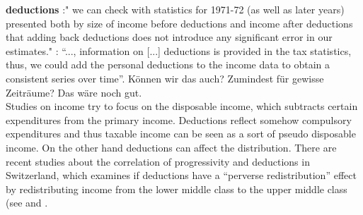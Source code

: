 \documentclass[twoside]{article}\usepackage[]{graphicx}\usepackage[]{color}
\begin{document}
\begin{multicols}{2}
\textbf{deductions} \citet[477]{dell_income_2007}:" we can check with statistics for 1971-72 (as well as later years) presented both by size of income before deductions and income after deductions that adding back deductions does not introduce any significant error in our estimates."
\citet[5]{schaltegger_evolution_2011 UNSICHER}: ``..., information on [...] deductions is provided in the tax statistics, thus, we could add the personal deductions to the income data to obtain a consistent series over time''. Können wir das auch? Zumindest für gewisse Zeiträume? Das wäre noch gut. \\

Studies on income try to focus on the disposable income, which subtracts certain expenditures from the primary income. Deductions reflect somehow compulsory expenditures and thus taxable income can be seen as a sort of pseudo disposable income. On the other hand deductions can affect the distribution. There are recent studies about the correlation of progressivity and deductions in Switzerland, which examines if deductions have a ``perverse redistribution'' effect by redistributing income from the lower middle class to the upper middle class (see \citealt{peters_steuerabzuge:_2011} and \citet{Interpellation Barbara Gysel (2009) FEHLT. das interpellation barbara sieht falsch aus}.






\end{multicols}
\end{document}
